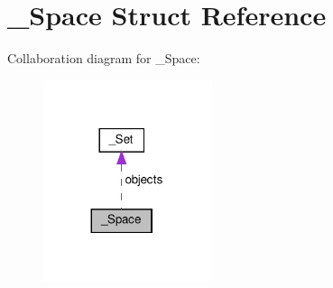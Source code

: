 \hypertarget{struct__Space}{}\section{\+\_\+\+Space Struct Reference}
\label{struct__Space}


Collaboration diagram for \+\_\+\+Space\+:\nopagebreak
\begin{figure}[H]
\begin{center}
\leavevmode
\includegraphics[width=140pt]{struct__Space__coll__graph}
\end{center}
\end{figure}
